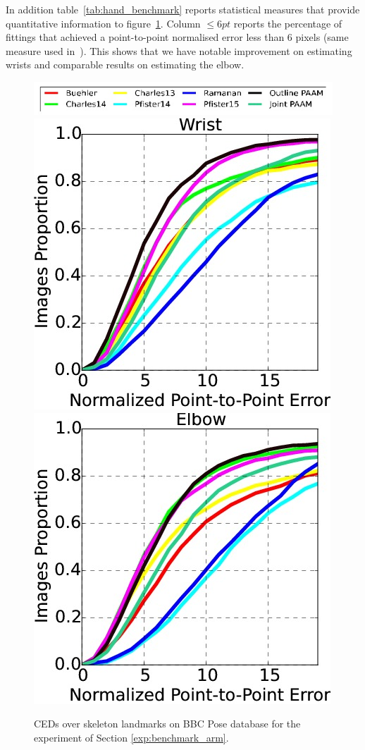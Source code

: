In addition table~\ref{tab:hand_benchmark} reports statistical measures that provide quantitative information to figure~\ref{fig:hand_benchmark}. Column $\leq 6pt$ reports the percentage of fittings that achieved a point-to-point normalised error less than 6 pixels (same measure used in~\cite{pfister2015flowing}). This shows that we have notable improvement on estimating wrists and comparable results on estimating the elbow.

\begin{figure}
    \centering
    \includegraphics[width=\columnwidth]{resources/Annotation_Correction/HandBenchmark/legend}
    \\
    \includegraphics[width=0.48\columnwidth]{resources/Annotation_Correction/HandBenchmark/wrist}
    \includegraphics[width=0.48\columnwidth]{resources/Annotation_Correction/HandBenchmark/elbow}
    \caption{CEDs over skeleton landmarks on BBC Pose database for the experiment of Section  \ref{exp:benchmark_arm}.}
    \label{fig:hand_benchmark}
\end{figure}
~

